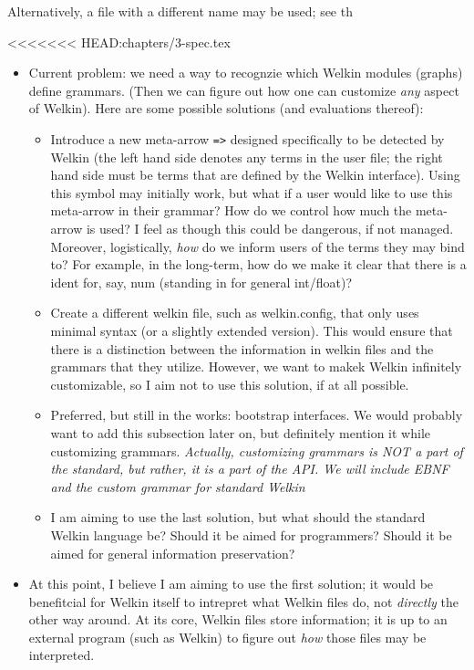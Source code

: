 Alternatively, a file with a different name may be used; see th


<<<<<<< HEAD:chapters/3-spec.tex
\begin{itemize}
	\item Current problem: we need a way to recognzie which Welkin modules (graphs) define grammars. (Then we can figure out how one can customize \textit{any} aspect of Welkin). Here are some possible solutions (and evaluations thereof):
				\begin{itemize}
					\item Introduce a new meta-arrow \texttt{=>} designed specifically to be detected by Welkin (the left hand side denotes any terms in the user file; the right hand side must be terms that are defined by the Welkin interface). Using this symbol may initially work, but what if a user would like to use this meta-arrow in their grammar? How do we control how much the meta-arrow is used? I feel as though this could be dangerous, if not managed. Moreover, logistically, \textit{how} do we inform users of the terms they may bind to? For example, in the long-term, how do we make it clear that there is a ident for, say, num (standing in for general int/float)?
					\item Create a different welkin file, such as welkin.config, that only uses minimal syntax (or a slightly extended version). This would ensure that there is a distinction between the information in welkin files and the grammars that they utilize. However, we want to makek Welkin infinitely customizable, so I aim not to use this solution, if at all possible.
					\item Preferred, but still in the works: bootstrap interfaces. We would probably want to add this subsection later on, but definitely mention it while customizing grammars. \textit{Actually, customizing grammars is NOT a part of the standard, but rather, it is a part of the API. We will include EBNF and the custom grammar for standard Welkin}
				  \item I am aiming to use the last solution, but what should the standard Welkin language be? Should it be aimed for programmers? Should it be aimed for general information preservation?
				\end{itemize}
	\item At this point, I believe I am aiming to use the first solution; it would be benefitcial for Welkin itself to intrepret what Welkin files do, not \textit{directly} the other way around. At its core, Welkin files store information; it is up to an external program (such as Welkin) to figure out \textit{how} those files may be interpreted.

\end{itemize}

